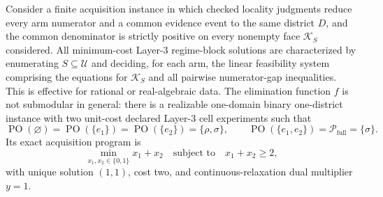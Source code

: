 Consider a finite acquisition instance in which checked locality judgments reduce every arm numerator and a common evidence event to the same district \(D\), and the common denominator is strictly positive on every nonempty face \(\mathcal K_S\) considered.  All minimum-cost Layer-3 regime-block solutions are characterized by enumerating \(S\subseteq\mathcal U\) and deciding, for each arm, the linear feasibility system comprising the equations for \(\mathcal K_S\) and all pairwise numerator-gap inequalities.  This is effective for rational or real-algebraic data.  The elimination function \(f\) is not submodular in general: there is a realizable one-domain binary one-district instance with two unit-cost declared Layer-3 cell experiments such that
\[
\operatorname{PO}(\varnothing)=\operatorname{PO}(\{e_1\})
=\operatorname{PO}(\{e_2\})=\{\rho,\sigma\},
\qquad
\operatorname{PO}(\{e_1,e_2\})=\mathcal P_{\mathrm{full}}=\{\sigma\}.
\]
Its exact acquisition program is
\[
\min_{x_1,x_2\in\{0,1\}}x_1+x_2
\quad\text{subject to}\quad x_1+x_2\ge2,
\]
with unique solution \((1,1)\), cost two, and continuous-relaxation dual multiplier \(y=1\).